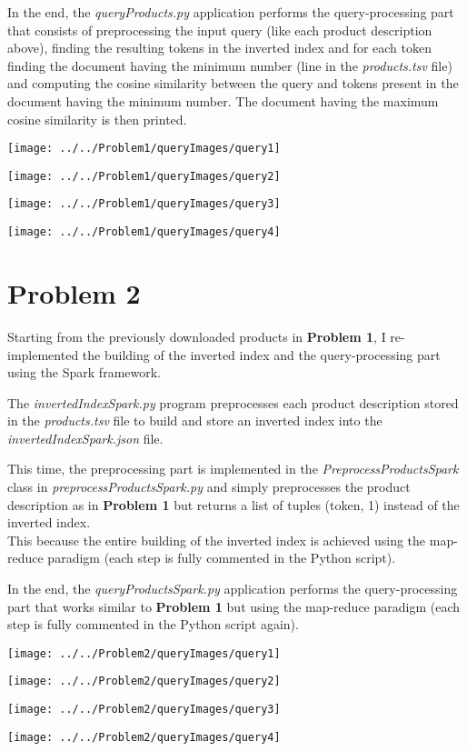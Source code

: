 \documentclass[11pt]{article}
\begin{document}
\bigskip
In the end, the \textit{queryProducts.py} application performs the query-processing part that consists of preprocessing the
input query (like each product description above), finding the resulting tokens in the inverted index and for each token
finding the document having the minimum number (line in the \textit{products.tsv} file) and computing the cosine similarity
between the query and tokens present in the document having the minimum number.
The document having the maximum cosine similarity is then printed.

\newpage
{
\centering
\texttt{[image: ../../Problem1/queryImages/query1]}

\bigskip
\texttt{[image: ../../Problem1/queryImages/query2]}

\bigskip
\texttt{[image: ../../Problem1/queryImages/query3]}

\bigskip
\texttt{[image: ../../Problem1/queryImages/query4]}
}


\newpage
\section{Problem 2}
Starting from the previously downloaded products in \textbf{Problem 1}, I re-implemented the building of the inverted index
and the query-processing part using the Spark framework.

\bigskip
The \textit{invertedIndexSpark.py} program preprocesses each product description stored in the \textit{products.tsv} file
to build and store an inverted index into the \textit{invertedIndexSpark.json} file.

\bigskip
This time, the preprocessing part is implemented in the \textit{PreprocessProductsSpark} class in
\textit{preprocessProductsSpark.py} and simply preprocesses the product description as in \textbf{Problem 1} but returns a list
of tuples (token, 1) instead of the inverted index. \\
This because the entire building of the inverted index is achieved using the map-reduce paradigm (each step is fully commented
in the Python script).

\bigskip
In the end, the \textit{queryProductsSpark.py} application performs the query-processing part that works similar to
\textbf{Problem 1} but using the map-reduce paradigm (each step is fully commented in the Python script again).

\bigskip
{
\centering
\texttt{[image: ../../Problem2/queryImages/query1]}

\bigskip
\texttt{[image: ../../Problem2/queryImages/query2]}

\bigskip
\texttt{[image: ../../Problem2/queryImages/query3]}

\bigskip
\texttt{[image: ../../Problem2/queryImages/query4]}
}
\end{document}
